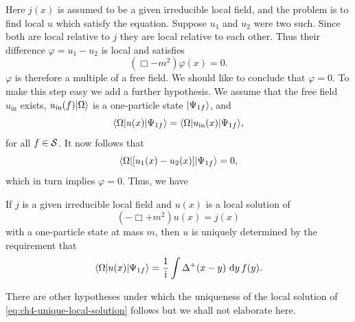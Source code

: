 Here $j(x)$ is assumed to be a given irreducible local field, and the problem
is to find local $u$ which satisfy the equation. Suppose $u_1$ and $u_2$ were
two such. Since both are local relative to $j$ they are local relative to each
other. Thus their difference $\varphi=u_1-u_2$ is local and satisfies
\begin{equation*}
  (\Box-m^2)\varphi(x)=0.
\end{equation*}
$\varphi$ is therefore a multiple of a free field. We should like to conclude
that $\varphi=0$. To make this step easy we add a further hypothesis. We
assume that the free field $u_{\mathrm{in}}$ exists,
$u_{\mathrm{in}}(f)\lvert \Omega\rangle$ is a one-particle state $\lvert \Psi_{1f}\rangle$,
and
\begin{equation*}
  \langle \Omega\rvert u(x)\lvert \Psi_{1f}\rangle
  =\langle \Omega\rvert u_{\mathrm{in}}(x)\lvert \Psi_{1f}\rangle,
\end{equation*}
for all $f\in\mathcal{S}$. It now follows that
\begin{equation*}
  \langle \Omega\rvert[u_1(x)-u_2(x)]\lvert \Psi_{1f}\rangle=0,
\end{equation*}
which in turn implies $\varphi=0$. Thus, we have

\begin{theorem}[4-22]\label{thm:ch4-22-unique-local-solution}
If $j$ is a given irreducible local field and $u(x)$ is a local solution of
\begin{equation}
  (-\Box+m^2)u(x)=j(x)
  \tag{4-101}\label{eq:ch4-unique-local-solution}
\end{equation}
with a one-particle state at mass $m$, then $u$ is uniquely determined by the
requirement that
\begin{equation*}
  \langle \Omega\rvert u(x)\lvert \Psi_{1f}\rangle
  =\frac{1}{\mathrm{i}}\int\Delta^+(x-y)\,\mathop{}\!\mathrm{d} y\,f(y).
\end{equation*}
\end{theorem}

There are other hypotheses under which the uniqueness of the local solution of
\eqref{eq:ch4-unique-local-solution} follows but we shall not elaborate here.
